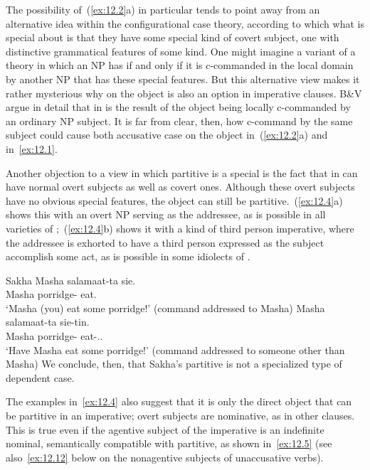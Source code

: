 \documentclass[output=paper]{langsci/langscibook}
\begin{document}
The possibility of~(\ref{ex:12.2}a) in particular tends to point away from
an alternative idea within the configurational case theory, according to which
what is special about  is that they have some special kind of covert
subject, one with distinctive grammatical features of some kind. One might
imagine a variant of a  theory \citep{Marantz1991} in which
an NP has  if and only if it is c-commanded in the local domain
by another NP that has these special features. But this alternative view makes
it rather mysterious why  on the object is also an option in
imperative clauses. B\&V argue in detail that  in  is
the result of the object being locally c-commanded by an ordinary NP subject.
It is far from clear, then, how c-command by the same subject could cause both
accusative case on the object in~(\ref{ex:12.2}a) and 
in~\eqref{ex:12.1}.

Another objection to a view in which partitive is a special  is the fact that  in  can have normal overt
subjects as well as covert ones. Although these overt subjects have no obvious
special features, the object can still be partitive.~(\ref{ex:12.4}a) shows
this with an overt NP serving as the addressee, as is possible in all varieties
of ;~(\ref{ex:12.4}b) shows it with a kind of third person
imperative, where the addressee is exhorted to have a third person expressed as
the subject accomplish some act, as is possible in some idiolects of
 \citep{Zanuttini2008}.

\ea\label{ex:12.4}Sakha
	\ea
		\gll Masha  salamaat-ta sie.\\
			Masha  porridge-\Part{}  eat.\Imp{}\\
		\glt ‘Masha (you) eat some porridge!’ (command addressed to Masha)
	\ex
		\gll Masha  salamaat-ta sie-tin.\\
			Masha  porridge-\Part{}  eat-\Imp{}.\Tsg.\Sbj{}\\
		\glt ‘Have Masha eat some porridge!’ (command addressed to someone other than Masha)
	\z
\z
We conclude, then, that Sakha’s partitive is not a specialized type of
dependent case.

The examples in~\eqref{ex:12.4} also suggest that it is only the direct
object that can be partitive in an imperative; overt subjects are nominative,
as in other clauses.  This is true even if the agentive subject of the
imperative is an indefinite nominal, semantically compatible with partitive, as
shown in~\eqref{ex:12.5} (see also~\eqref{ex:12.12} below on the
nonagentive subjects of unaccusative verbs).
\end{document}
